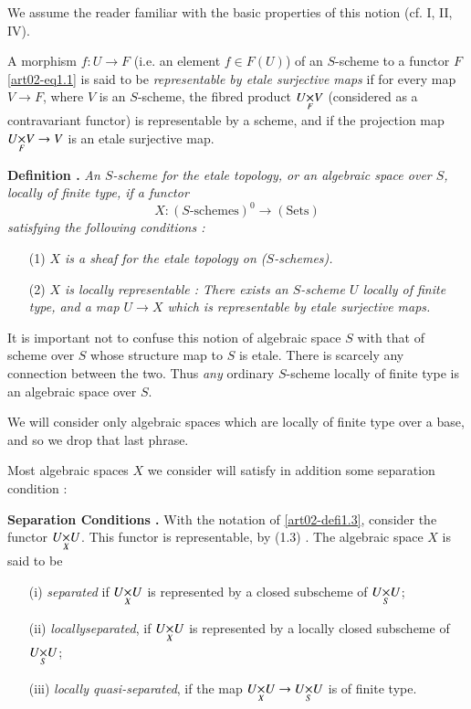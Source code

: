 We assume the reader familiar with the basic properties of this notion (cf. \cite{art02-key6} I, II, \cite{art02-key7} IV).

A morphism $f:U\to F$ (i.e. an element $f\in F(U)$) of an $S$-scheme to a functor $F$ \eqref{art02-eq1.1} is said to be {\em representable by etale surjective maps} if for every map $V\to F$, where $V$ is an $S$-scheme, the fibred product $\fprod{U}{V}{F}$ (considered as a contravariant functor) is representable by a scheme, and if the projection map $\fprod{U}{V}{F}\to V$ is an etale surjective map.

\medskip
\noindent
{\bf Definition .\label{art02-defi1.3}}
{\em An $S$-scheme for the etale topology, or an algebraic space over $S$, locally of finite type, if a functor}
$$
X:(S\text{-schemes})^{0}\to (\text{Sets})
$$
{\em satisfying the following conditions :}
\begin{itemize}
\item[\rm(1)] {\em $X$ is a sheaf for the etale topology on ($S$-schemes).}

\item[\rm(2)] {\em $X$ is locally representable : There exists an $S$-scheme $U$ locally of finite type, and a map $U\to X$ which is representable by etale surjective maps.}
\end{itemize}

It is important not to confuse this notion of algebraic space $S$ with that of scheme over $S$ whose structure map to $S$ is etale. There is scarcely any connection between the two. Thus {\em any} ordinary $S$-scheme locally of finite type is an algebraic space over $S$.

We will consider only algebraic spaces which are locally of finite type over a base, and so we drop that last phrase.

Most algebraic spaces $X$ we consider will satisfy in addition some separation condition :

\medskip
\noindent
{\bf Separation Conditions .\label{art02-sc1.4}}
With the notation of \eqref{art02-defi1.3}, consider the functor $\fprod{U}{U}{X}$. This functor is representable, by (1.3) \cite{art02-key2}. The algebraic space $X$ is said to be
\begin{itemize}
\item[(i)] {\em separated} if $\fprod{U}{U}{X}$ is represented by a closed subscheme of $\fprod{U}{U}{S}$;

\item[(ii)] {\em locally\pageoriginale separated}, if $\fprod{U}{U}{X}$ is represented by a locally closed subscheme of $\fprod{U}{U}{S}$;

\item[(iii)] {\em locally quasi-separated}, if the map $\fprod{U}{U}{X}\to \fprod{U}{U}{S}$ is of finite type.
\end{itemize}

